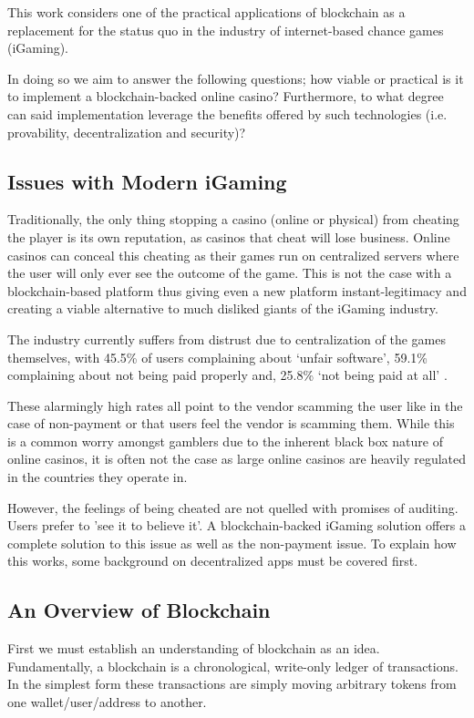 \documentclass[10pt,journal,compsoc]{IEEEtran}
\begin{document}
This work considers one of the practical applications of blockchain as a replacement for the status quo in the industry of internet-based chance games (iGaming). 

In doing so we aim to answer the following questions; how viable or practical is it to implement a blockchain-backed online casino? Furthermore, to what degree can said implementation leverage the benefits offered by such technologies (i.e. provability, decentralization and security)?
\subsection{Issues with Modern iGaming}
\label{sec:problems}
Traditionally, the only thing stopping a casino (online or physical) from cheating the player is its own reputation, as casinos that cheat will lose business. Online casinos can conceal this cheating as their games run on centralized servers where the user will only ever see the outcome of the game. This is not the case with a blockchain-based platform thus giving even a new platform instant-legitimacy and creating a viable alternative to much disliked giants of the iGaming industry. 

The industry currently suffers from distrust due to centralization of the games themselves, with 45.5\% of users complaining about ‘unfair software’, 59.1\% complaining about not being paid properly and, 25.8\% ‘not being paid at all’ \cite{Gainsbury2013}. 

These alarmingly high rates all point to the vendor scamming the user like in the case of non-payment or that users feel the vendor is scamming them. While this is a common worry amongst gamblers due to the inherent black box nature of online casinos, it is often not the case as large online casinos are heavily regulated in the countries they operate in.

However, the feelings of being cheated are not quelled with promises of auditing. Users prefer to 'see it to believe it'. A blockchain-backed iGaming solution offers a complete solution to this issue as well as the non-payment issue. To explain how this works, some background on decentralized apps must be covered first.
\subsection{An Overview of Blockchain}
\label{sec:introtobloc}
First we must establish an understanding of blockchain as an idea. Fundamentally, a blockchain is a chronological, write-only ledger of transactions. In the simplest form these transactions are simply moving arbitrary tokens from one wallet/user/address to another.
\end{document}
